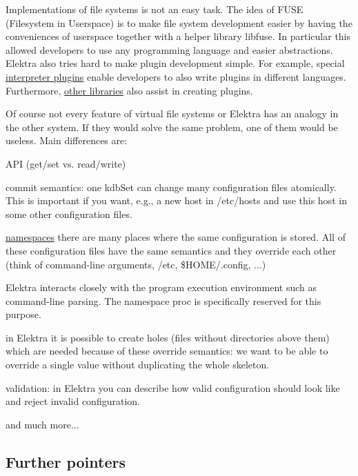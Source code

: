 Implementations of file systems is not an easy task. The idea of F\+U\+SE (Filesystem in Userspace) is to make file system development easier by having the conveniences of userspace together with a helper library {\ttfamily libfuse}. In particular this allowed developers to use any programming language and easier abstractions. Elektra also tries hard to make plugin development simple. For example, special \hyperlink{md_src_plugins_README_src_plugins_README_md}{interpreter plugins} enable developers to also write plugins in different languages. Furthermore, \hyperlink{md_src_libs_README_src_libs_README_md}{other libraries} also assist in creating plugins.

Of course not every feature of virtual file systems or Elektra has an analogy in the other system. If they would solve the same problem, one of them would be useless. Main differences are\+:


\begin{DoxyItemize}
\item A\+PI (get/set vs. read/write)
\item commit semantics\+: one {\ttfamily kdb\+Set} can change many configuration files atomically. This is important if you want, e.\+g., a new host in {\ttfamily /etc/hosts} and use this host in some other configuration files.
\item \hyperlink{md_doc_help_elektra-namespaces_doc_help_elektra-namespaces_md}{namespaces} there are many places where the same configuration is stored. All of these configuration files have the same semantics and they override each other (think of command-\/line arguments, {\ttfamily /etc}, {\ttfamily \$\+H\+O\+ME/.config}, ...)
\item Elektra interacts closely with the program execution environment such as command-\/line parsing. The namespace {\ttfamily proc} is specifically reserved for this purpose.
\item in Elektra it is possible to create holes (files without directories above them) which are needed because of these override semantics\+: we want to be able to override a single value without duplicating the whole skeleton.
\item validation\+: in Elektra you can describe how valid configuration should look like and reject invalid configuration.
\item and much more...
\end{DoxyItemize}

\subsection*{Further pointers}


